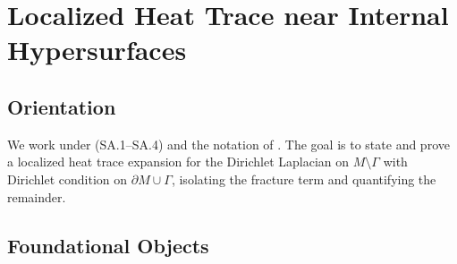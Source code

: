 
\chapter{Localized Heat Trace near Internal Hypersurfaces}
\label{chap:lht-internal}

\makeatletter
{}
\makeatother

\providecommand{\Orientation}{\par\noindent\textbf{Orientation.}\ }
\providecommand{\Objectives}{\par\noindent\textbf{Objectives.}\ }
\providecommand{\Invariants}{\par\noindent\textbf{Invariants/Assumptions.}\ }
\providecommand{\Statement}{\par\noindent\textbf{Statement.}\ }
\providecommand{\ErrorBounds}{\par\noindent\textbf{Error bounds.}\ }
\providecommand{\Optimality}{\par\noindent\textbf{Optimality.}\ }
\providecommand{\Audit}{\par\noindent\textbf{Audit/Dependencies.}\ }
\providecommand{\Closure}{\par\noindent\textbf{Closure.}\ }

\section*{Orientation}
We work under (SA.1--SA.4) and the notation of .
The goal is to state and prove a localized heat trace expansion for
the Dirichlet Laplacian on $M\setminus \Gamma$ with Dirichlet condition on
$\partial M\cup\Gamma$, isolating the fracture term and quantifying the remainder.

\section{Foundational Objects}

